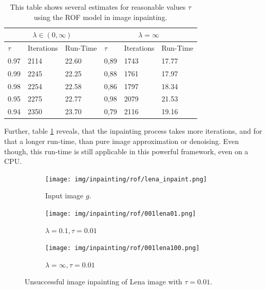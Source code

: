 \documentclass{scrreprt}
\begin{document}
            \begin{table}[!ht]
                \parbox{.9\linewidth}{
                \centering
                    \begin{tabular}{| l | l | l | l | l | l |}
                        \hline
                        \multicolumn{3}{|c|}{$\lambda \in (0, \infty)$} & \multicolumn{3}{|c|}{$\lambda = \infty$} \\ \hline\hline
                        $\tau$ & Iterations & Run-Time & $\tau$ & Iterations & Run-Time \\ \hline
                        0.97 & 2114 & 22.60 & 0,89 & 1743 & 17.77 \\ \hline
                        0.99 & 2245 & 22.25 & 0,88 & 1761 & 17.97 \\ \hline
                        0.98 & 2254 & 22.58 & 0,86 & 1797 & 18.34 \\ \hline
                        0.95 & 2275 & 22.77 & 0,98 & 2079 & 21.53 \\ \hline
                        0.94 & 2350 & 23.70 & 0,79 & 2116 & 19.16 \\ \hline
                    \end{tabular}
                }
                \caption[Best estimate of $\tau$ for image inpainting.]{This table shows several estimates for reasonable values $\tau$ using the ROF model in image inpainting.}
                \label{tab:best_tau_inpaint}
            \end{table}

        Further, table \ref{tab:best_tau_inpaint} reveals, that the inpainting process takes more iterations, and for that a longer run-time, than pure image approximation or denoising. Even though, this run-time is still applicable in this powerful framework, even on a CPU.

            \begin{figure}[!ht]
                \centering
                \begin{subfigure}[b]{0.30\textwidth}
                    \texttt{[image: img/inpainting/rof/lena\_inpaint.png]}
                    \caption{Input image $g$.}
                \end{subfigure}
                \begin{subfigure}[b]{0.30\textwidth}
                    \texttt{[image: img/inpainting/rof/001lena01.png]}
                    \caption{$\lambda = 0.1, \tau = 0.01$}
                \end{subfigure}
                \begin{subfigure}[b]{0.30\textwidth}
                    \texttt{[image: img/inpainting/rof/001lena100.png]}
                    \caption{$\lambda = \infty, \tau = 0.01$}
                \end{subfigure}
                \caption[Unsuccessful inpainting process with small $\tau$.]{Unsuccessful image inpainting of Lena image with $\tau = 0.01$.}
                \label{fig:unsuccessful_inpainting}
            \end{figure}
\end{document}

